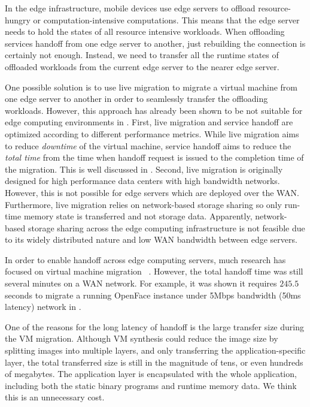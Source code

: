 %
In the edge infrastructure, mobile devices use edge servers to offload resource-hungry or computation-intensive computations. This means that the edge server needs to hold the states of all resource intensive workloads. 
When offloading services handoff from one edge server to another, just rebuilding the connection is certainly not enough. Instead, we need to transfer all the runtime states of offloaded workloads from the current edge server to the nearer edge server.  

One possible solution is 
to use live migration\cite{vmlivemig} 
to migrate a virtual machine from one edge server to another in order to seamlessly transfer the offloading workloads. However, this approach has already been shown to be not suitable for edge computing environments in  \cite{ha2015vmhandoff}. First, live migration and service handoff are optimized according to different performance metrics. While live migration aims to reduce \textit{downtime} of the virtual machine, service handoff aims to reduce the \textit{total time} from the time when handoff request is issued to the completion time of the migration. This is well discussed in \cite{ha2015vmhandoff}.
Second, live migration is originally designed for high performance data centers with high bandwidth networks. However, this is not possible for edge servers which are deployed over the WAN. Furthermore, live migration relies on network-based storage sharing so only run-time memory state is transferred and not storage data. Apparently, network-based storage sharing across the edge computing infrastructure is not feasible due to its widely distributed nature and low WAN bandwidth between edge servers. 

In order to enable handoff across edge computing servers, much research has focused on virtual machine migration ~\cite{satya2009case,ha2015vmhandoff}. 
However, the total handoff time was still several minutes on a WAN network. For example, it was shown it requires $245.5$ seconds to migrate a running OpenFace instance under 5Mbps bandwidth (50ms latency) network in \cite{ha2015vmhandoff}. 

One of the reasons for the long latency of handoff is the large transfer size during the VM migration. Although VM synthesis could reduce the image size by splitting images into multiple layers, and only transferring the application-specific layer, the total transferred size is still in the magnitude of tens, or even hundreds of megabytes. 
The application layer is encapsulated with the whole application, including both the static binary programs and runtime memory data. We think this is an unnecessary cost. 


